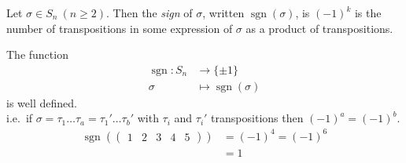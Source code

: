 \begin{definition}
Let \(\sigma \in S_n \ (n \geq 2)\).
Then the \emph{sign} of \(\sigma\), written \(\operatorname{sgn}(\sigma)\), is \((-1)^k\) is the number of transpositions in some expression of \(\sigma\) as a product of transpositions.
\end{definition}

\begin{lemma}
\protect\hypertarget{lem:eight}{}\label{lem:eight}The function \begin{align*}
    \operatorname{sgn} : S_n &\to \{ \pm 1 \} \\
    \sigma &\mapsto \operatorname{sgn}(\sigma)
\end{align*} is well defined.\\
i.e.~if \(\sigma = \tau_1 \ldots \tau_a = \tau_1' \ldots \tau_b'\) with \(\tau_i\) and \(\tau_i'\) transpositions then \((-1)^a = (-1)^b\).
\begin{align*}
    \operatorname{sgn}\left(\begin{pmatrix}1 & 2 & 3 & 4 & 5\end{pmatrix}\right) &= (-1)^4 = (-1)^6 \\
    &= 1
\end{align*}
\end{lemma}

